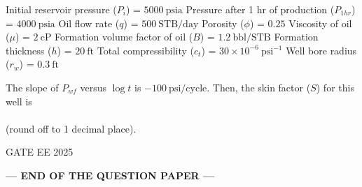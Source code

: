 \documentclass[journal]{IEEEtran}
\begin{document}
\begin{enumerate}[leftmargin=*,series=q]
Initial reservoir pressure ($P_{i}$) = $5000 \ \text{psia}$  
Pressure after 1 hr of production ($P_{1hr}$) = $4000 \ \text{psia}$  
Oil flow rate ($q$) = $500 \ \text{STB/day}$  
Porosity ($\phi$) = $0.25$  
Viscosity of oil ($\mu$) = $2 \ \text{cP}$  
Formation volume factor of oil ($B$) = $1.2 \ \text{bbl/STB}$  
Formation thickness ($h$) = $20 \ \text{ft}$  
Total compressibility ($c_{t}$) = $30 \times 10^{-6} \ \text{psi}^{-1}$  
Well bore radius ($r_{w}$) = $0.3 \ \text{ft}$  

The slope of $P_{wf}$ versus $\log t$ is $-100 \ \text{psi/cycle}$. Then, the skin factor ($S$) for this well is \\\\ (round off to 1 decimal place).  

GATE EE 2025
\end{enumerate}
\vspace{0.5cm}
\begin{center}
\textbf{\large --- END OF THE QUESTION PAPER ---}
\end{center}
\end{document}
